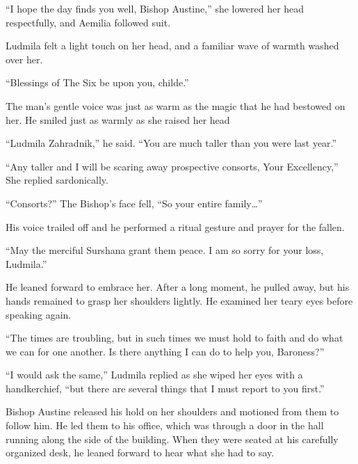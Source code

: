 

“I hope the day finds you well, Bishop Austine,” she lowered her head respectfully, and Aemilia followed suit.

 

Ludmila felt a light touch on her head, and a familiar wave of warmth washed over her.

 

“Blessings of The Six be upon you, childe.”

 

The man’s gentle voice was just as warm as the magic that he had bestowed on her. He smiled just as warmly as she raised her head

 

“Ludmila Zahradnik,” he said. “You are much taller than you were last year.”

 

“Any taller and I will be scaring away prospective consorts, Your Excellency,” She replied sardonically.

 

“Consorts?” The Bishop’s face fell, “So your entire family…”

 

His voice trailed off and he performed a ritual gesture and prayer for the fallen.

 

“May the merciful Surshana grant them peace. I am so sorry for your loss, Ludmila.”

 

He leaned forward to embrace her. After a long moment, he pulled away, but his hands remained to grasp her shoulders lightly. He examined her teary eyes before speaking again.

 

“The times are troubling, but in such times we must hold to faith and do what we can for one another. Is there anything I can do to help you, Baroness?”

 

“I would ask the same,” Ludmila replied as she wiped her eyes with a handkerchief, “but there are several things that I must report to you first.”

 

Bishop Austine released his hold on her shoulders and motioned from them to follow him. He led them to his office, which was through a door in the hall running along the side of the building. When they were seated at his carefully organized desk, he leaned forward to hear what she had to say.

